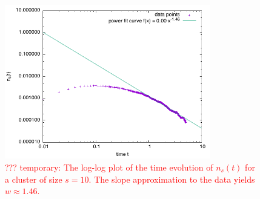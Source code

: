 \begin{figure}
	\begin{center}
		\includegraphics[width = 0.8\textwidth]{fig/plotTest.png}
		\caption{\textcolor{red}{??? temporary: The log-log plot of the time evolution of $n_s(t)$ for a cluster of size $s = 10$. The slope approximation to the data yields $w \approx 1.46$.}}
		\label{fig:loglog2d-DLA_1mill}
	\end{center}
\end{figure}